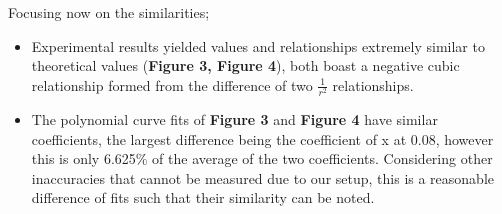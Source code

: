 \documentclass{article}
\begin{document}
   Focusing now on the similarities;
   \begin{itemize}
       \item Experimental results yielded values and relationships extremely similar to theoretical values (\textbf{Figure 3, Figure 4}), both boast a negative cubic relationship 
       formed from the difference of two \(\frac{1}{r^2}\) relationships.
       \item The polynomial curve fits of \textbf{Figure 3} and \textbf{Figure 4} have similar coefficients, the largest difference being the coefficient of x at 0.08, however this is only 6.625\% of the average of the 
       two coefficients. Considering other inaccuracies that cannot be measured due to our setup, this is a reasonable difference of fits such that their similarity can be noted.
   \end{itemize}
\end{document}
